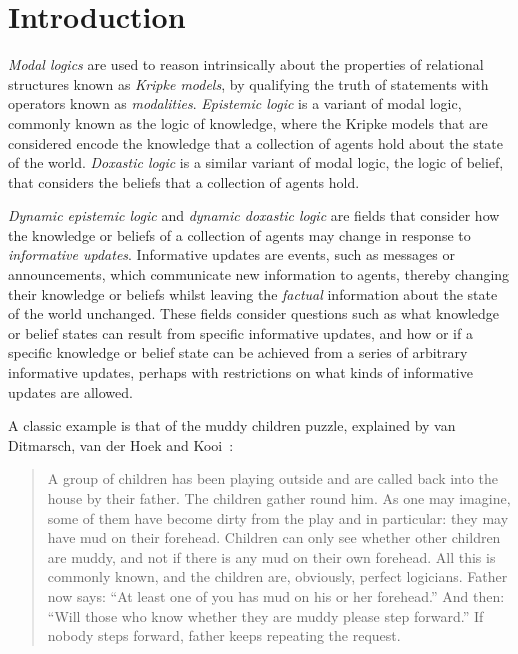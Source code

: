 \chapter{Introduction}


{\em Modal logics} are used to reason intrinsically about the properties of
relational structures known as {\em Kripke models}, by qualifying the truth of
statements with operators known as {\em modalities}. {\em Epistemic logic} is a
variant of modal logic, commonly known as the logic of knowledge, where
the Kripke models that are considered encode the knowledge that a collection of
agents hold about the state of the world. {\em Doxastic logic} is a similar
variant of modal logic, the logic of belief, that considers the beliefs that a
collection of agents hold.

{\em Dynamic epistemic logic} and {\em dynamic doxastic logic} are fields that
consider how the knowledge or beliefs of a collection of agents may change in
response to {\em informative updates}. Informative updates are events, such as
messages or announcements, which communicate new information to agents, thereby
changing their knowledge or beliefs whilst leaving the {\em factual}
information about the state of the world unchanged. These fields consider
questions such as what knowledge or belief states can result from specific
informative updates, and how or if a specific knowledge or belief state can be
achieved from a series of arbitrary informative updates, perhaps with
restrictions on what kinds of informative updates are allowed.

A classic example is that of the muddy children puzzle, explained by van
Ditmarsch, van der Hoek and Kooi~\cite{vanditmarsch2007dynamic}:

\begin{quote}
A group of children has been playing outside and are called back into the house
by their father. The children gather round him. As one may imagine, some of them
have become dirty from the play and in particular: they may have mud on their
forehead. Children can only see whether other children are muddy, and not if
there is any mud on their own forehead. All this is commonly known, and the
children are, obviously, perfect logicians. Father now says: “At least one of
you has mud on his or her forehead.” And then: “Will those who know whether they
are muddy please step forward.” If nobody steps forward, father keeps repeating
the request.
\end{quote}

